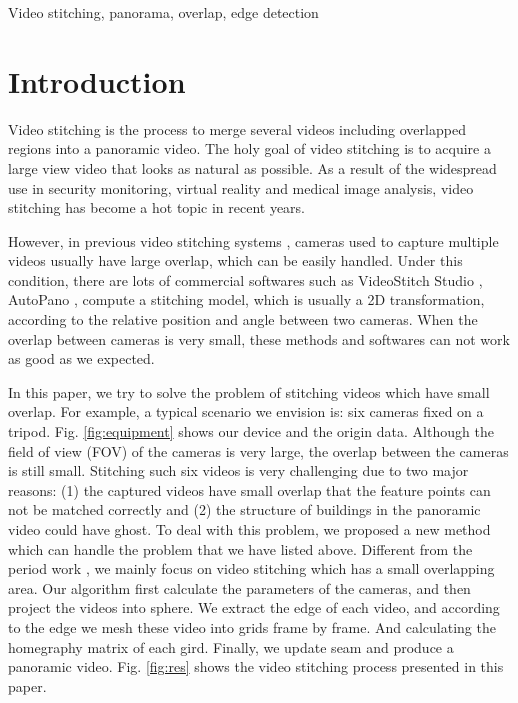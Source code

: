 \documentclass[conference]{IEEEtran}
\begin{document}
\begin{IEEEkeywords}
Video stitching, panorama, overlap, edge detection
\end{IEEEkeywords}

\section{Introduction}
\label{sec:intro}

Video stitching is the process to merge several videos
including overlapped regions into a panoramic video. The
holy goal of video stitching is to acquire a large view video
that looks as natural as possible. As a result of the widespread
use in security monitoring, virtual reality and medical image
analysis, video stitching has become a hot topic in recent years.

However, in previous video stitching systems \cite{zheng2008stitching, guo2016joint, Jiang_2015_CVPR_Workshops, nie2018dynamic},
cameras used to capture multiple videos usually have large overlap, which can be easily handled.
Under this condition, there are lots of commercial softwares such as VideoStitch Studio \cite{videostitching}, AutoPano \cite{autopano},
compute a stitching model, which is usually a 2D transformation,
according to the relative position and angle between two cameras. 
When the overlap between cameras is very small, these methods and softwares can
not work as good as we expected.

In this paper, we try to solve the problem of stitching videos which have small overlap. 
For example, a typical scenario we envision is: six cameras fixed on 
a tripod. Fig. \ref{fig:equipment} shows our device and the origin data. Although the field of view (FOV) of the cameras is very large, the overlap between the 
cameras is still small. Stitching such six videos is very challenging due to two
major reasons: (1) the captured videos have small overlap that the feature points can not be matched correctly 
and (2) the structure of buildings in the panoramic video could have ghost.
To deal with this problem, we proposed a new method which can handle the problem that we have listed above.
Different from the period work \cite{Jiang_2015_CVPR_Workshops}, we mainly focus on video stitching which has a small overlapping area.
Our algorithm first calculate the parameters of the cameras, and then project
the videos into sphere. We extract the edge of each video, and according to the edge we mesh these video into grids frame by frame.
And calculating the homegraphy matrix of each gird. Finally, we update seam and produce a panoramic video.
Fig. \ref{fig:res} shows the video stitching process presented in this paper.
\end{document}
